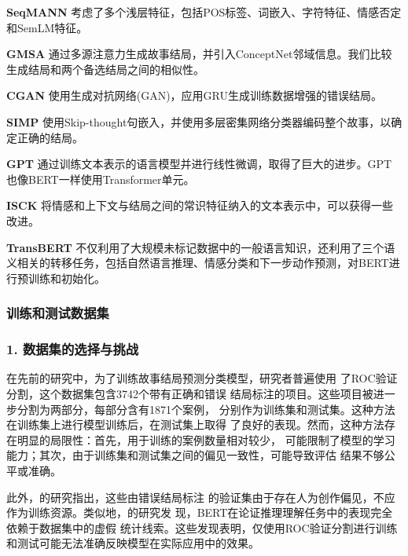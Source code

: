 \textbf{SeqMANN}\cite{li2018multi} 考虑了多个浅层特征，包括POS标签、词嵌入、字符特征、情感否定和SemLM\cite{peng2016two}特征。

\textbf{GMSA}\cite{guan2018story} 通过多源注意力生成故事结局，并引入ConceptNet邻域信息。我们比较生成结局和两个备选结局之间的相似性。

\textbf{CGAN}\cite{wang2017conditional} 使用生成对抗网络(GAN)，应用GRU生成训练数据增强的错误结局。

\textbf{SIMP}\cite{srinivasan2018simple} 使用Skip-thought句嵌入，并使用多层密集网络分类器编码整个故事，以确定正确的结局。

\textbf{GPT}\cite{radford2018improving} 通过训练文本表示的语言模型并进行线性微调，取得了巨大的进步。GPT也像BERT一样使用Transformer单元。

\textbf{ISCK}\cite{chen2018incorporating} 将情感和上下文与结局之间的常识特征纳入\cite{radford2018improving}的文本表示中，可以获得一些改进。

\textbf{TransBERT}\cite{li2019story} 不仅利用了大规模未标记数据中的一般语言知识，还利用了三个语义相关的转移任务，包括自然语言推理、情感分类和下一步动作预测，对BERT进行预训练和初始化。

\subsubsection{训练和测试数据集}
\label{sec2:dataset}
\subsubsection*{1. 数据集的选择与挑战}
在先前的研究中，为了训练故事结局预测分类模型，研究者普遍使用
了ROC验证分割，这个数据集包含3742个带有正确和错误
结局标注的项目。这些项目被进一步分割为两部分，每部分含有1871个案例，
分别作为训练集和测试集。这种方法在训练集上进行模型训练后，在测试集上取得
了良好的表现。然而，这种方法存在明显的局限性：首先，用于训练的案例数量相对较少，
可能限制了模型的学习能力；其次，由于训练集和测试集之间的偏见一致性，可能导致评估
结果不够公平或准确。

此外，\cite{sharma2018tackling}的研究指出，这些由错误结局标注
的验证集由于存在人为创作偏见，不应作为训练资源。类似地，\cite{niven2019probing}的研究发
现，BERT在论证推理理解任务\cite{habernal2018argument}中的表现完全依赖于数据集中的虚假
统计线索。这些发现表明，仅使用ROC验证分割进行训练和测试可能无法准确反映模型在实际应用中的效果。

